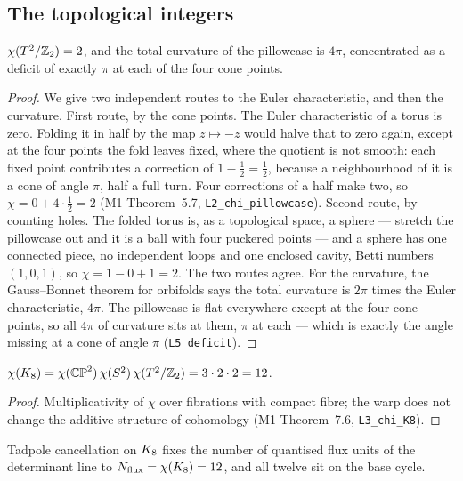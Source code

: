 \subsection{The topological integers}\label{sec:integers}

\begin{proposition}\label{prop:chi-pillowcase}
$\chi(T^2/\mathbb{Z}_2)=2$, and the total curvature of the pillowcase is $4\pi$,
concentrated as a deficit of exactly $\pi$ at each of the four cone points.
\end{proposition}

\begin{proof}
We give two independent routes to the Euler characteristic, and then the
curvature. First route, by the cone points. The Euler characteristic of a
torus is zero. Folding it in half by the map $z\mapsto-z$ would halve that
to zero again, except at the four points the fold leaves fixed, where the
quotient is not smooth: each fixed point contributes a correction of
$1-\tfrac12=\tfrac12$, because a neighbourhood of it is a cone of angle
$\pi$, half a full turn. Four corrections of a half make two, so
$\chi=0+4\cdot\tfrac12=2$ (M1 Theorem~5.7, \texttt{L2\_chi\_pillowcase}).
Second route, by counting holes. The folded torus is, as a topological
space, a sphere --- stretch the pillowcase out and it is a ball with four
puckered points --- and a sphere has one connected piece, no independent
loops and one enclosed cavity, Betti numbers $(1,0,1)$, so $\chi=1-0+1=2$.
The two routes agree. For the curvature, the Gauss--Bonnet theorem for
orbifolds \cite{Kawasaki1979} says the total curvature is $2\pi$ times the
Euler characteristic, $4\pi$. The pillowcase is flat everywhere except at
the four cone points, so all $4\pi$ of curvature sits at them, $\pi$ at
each --- which is exactly the angle missing at a cone of angle $\pi$
(\texttt{L5\_deficit}). \rigR
\end{proof}

\begin{proposition}\label{prop:chi-K8}
$\chi(K_8)=\chi(\mathbb{CP}^2)\,\chi(S^2)\,\chi(T^2/\mathbb{Z}_2)=3\cdot2\cdot2=12$.
\end{proposition}

\begin{proof}
Multiplicativity of $\chi$ over fibrations with compact fibre; the warp
does not change the additive structure of cohomology
(M1 Theorem~7.6, \texttt{L3\_chi\_K8}). \rigR
\end{proof}

\begin{proposition}\label{prop:flux}
Tadpole cancellation on $K_8$ fixes the number of quantised flux units
of the determinant line to $N_{\mathrm{flux}}=\chi(K_8)=12$, and all
twelve sit on the base cycle.
\end{proposition}

